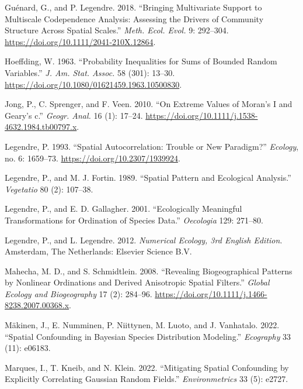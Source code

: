 \documentclass[
]{article}
\newlength{\cslhangindent}
\newenvironment{CSLReferences}[2] %
 {\begin{list}{}{%
  \setlength{\itemindent}{0pt}
  \setlength{\leftmargin}{0pt}
  \setlength{\parsep}{0pt}
  \ifodd #1
   \setlength{\leftmargin}{\cslhangindent}
   \setlength{\itemindent}{-1\cslhangindent}
  \fi
  \setlength{\itemsep}{#2\baselineskip}}}
 {\end{list}}
\begin{document}
\begin{CSLReferences}{1}{0}
Guénard, G., and P. Legendre. 2018. {``Bringing Multivariate Support to
Multiscale Codependence Analysis: Assessing the Drivers of Community
Structure Across Spatial Scales.''} \emph{Meth. Ecol. Evol.} 9:
292--304. \url{https://doi.org/10.1111/2041-210X.12864}.

Hoeffding, W. 1963. {``Probability Inequalities for Sums of Bounded
Random Variables.''} \emph{J. Am. Stat. Assoc.} 58 (301): 13--30.
\url{https://doi.org/10.1080/01621459.1963.10500830}.

Jong, P., C. Sprenger, and F. Veen. 2010. {``On Extreme Values of
{M}oran's {I} and {G}eary's {c}.''} \emph{Geogr. Anal.} 16 (1): 17--24.
\url{https://doi.org/10.1111/j.1538-4632.1984.tb00797.x}.

Legendre, P. 1993. {``Spatial Autocorrelation: Trouble or New
Paradigm?''} \emph{Ecology}, no. 6: 1659--73.
\url{https://doi.org/10.2307/1939924}.

Legendre, P., and M. J. Fortin. 1989. {``Spatial Pattern and Ecological
Analysis.''} \emph{Vegetatio} 80 (2): 107--38.

Legendre, P., and E. D. Gallagher. 2001. {``Ecologically Meaningful
Transformations for Ordination of Species Data.''} \emph{Oecologia} 129:
271--80.

Legendre, P., and L. Legendre. 2012. \emph{Numerical Ecology, 3rd
{E}nglish Edition}. Amsterdam, The Netherlands: Elsevier Science B.V.

Mahecha, M. D., and S. Schmidtlein. 2008. {``Revealing Biogeographical
Patterns by Nonlinear Ordinations and Derived Anisotropic Spatial
Filters.''} \emph{Global Ecology and Biogeography} 17 (2): 284--96.
\url{https://doi.org/10.1111/j.1466-8238.2007.00368.x}.

Mäkinen, J., E. Numminen, P. Niittynen, M. Luoto, and J. Vanhatalo.
2022. {``Spatial Confounding in {Bayesian} Species Distribution
Modeling.''} \emph{{Ecography}} 33 (11): e06183.

Marques, I., T. Kneib, and N. Klein. 2022. {``Mitigating Spatial
Confounding by Explicitly Correlating Gaussian Random Fields.''}
\emph{{Environmetrics}} 33 (5): e2727.


\end{CSLReferences}
\end{document}
